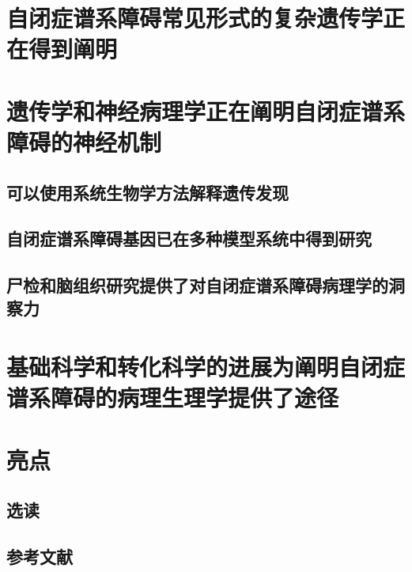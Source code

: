 \section{自闭症谱系障碍常见形式的复杂遗传学正在得到阐明}

\section{遗传学和神经病理学正在阐明自闭症谱系障碍的神经机制}
\subsection{可以使用系统生物学方法解释遗传发现}
\subsection{自闭症谱系障碍基因已在多种模型系统中得到研究}
\subsection{尸检和脑组织研究提供了对自闭症谱系障碍病理学的洞察力}

\section{基础科学和转化科学的进展为阐明自闭症谱系障碍的病理生理学提供了途径}

\section{亮点}
\subsection{选读}
\subsection{参考文献}